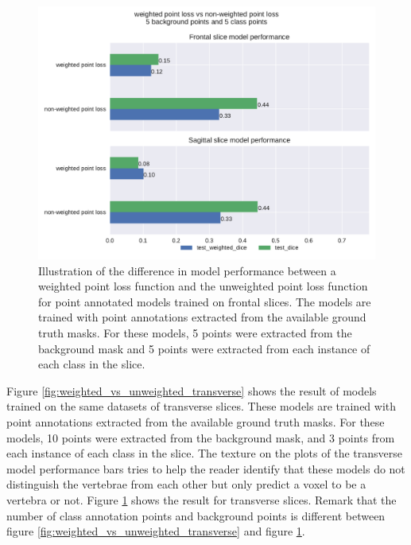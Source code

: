 \begin{figure}
    \centering
    \includegraphics[width=.95\textwidth]{images/weightedvsnonweighted.pdf}
    \caption{
        Illustration of the difference in model performance between a weighted point loss function and the unweighted point loss function for point annotated models trained on frontal slices.
        The models are trained with point annotations extracted from the available ground truth masks. For these models, 
        5 points were extracted from the background mask and 5 points were extracted from each instance of each class in the slice. 
        \label{fig:weighted_vs_unweighted}}
\end{figure}

Figure \ref{fig:weighted_vs_unweighted_transverse} shows the result of models trained on the same datasets of transverse slices.
These models are trained with point annotations extracted from the available ground truth masks. For these models, 
10 points were extracted from the background mask, and 3 points from each instance of each class in the slice. 
The texture on the plots of the transverse model performance bars tries to help the reader identify that these models do not distinguish the vertebrae from each other but only predict a voxel to be a vertebra or not.
Figure \ref{fig:weighted_vs_unweighted} shows the result for transverse slices.
Remark that the number of class annotation points and background points is different between figure \ref{fig:weighted_vs_unweighted_transverse} and figure \ref{fig:weighted_vs_unweighted}.


